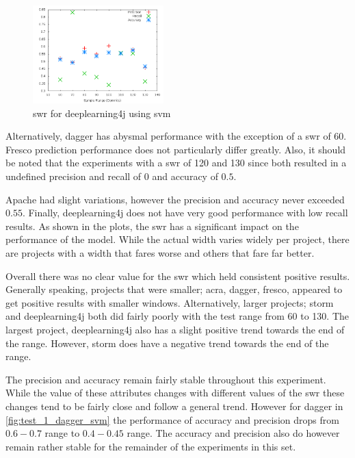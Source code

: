 \begin{figure}[h]
    \centering
        \includegraphics[width=0.45\textwidth]{images/svm/test_1/deeplearning4j_sample_range}
    \caption{\gls{swr} for deeplearning4j using \gls{svm}}
    \label{fig:test_1_deeplearning4j_svm}
\end{figure}

Alternatively, dagger has abysmal performance with the exception of a \gls{swr} of 60. Fresco prediction performance does not particularly differ greatly. Also, it should be noted that the experiments with a \gls{swr} of 120 and 130 since both resulted in a undefined precision and recall of 0 and accuracy of $0.5$.

Apache had slight variations, however the precision and accuracy never exceeded $0.55$. Finally, deeplearning4j does not have very good performance with low recall results. As shown in the plots, the \gls{swr} has a significant impact on the performance of the model. While the actual width varies widely per project, there are projects with a width that fares worse and others that fare far better.

Overall there was no clear value for the \gls{swr} which held consistent positive results. Generally speaking, projects that were smaller; acra, dagger, fresco, appeared to get positive results with smaller windows. Alternatively, larger projects; storm and deeplearning4j both did fairly poorly with the test range from 60 to 130. The largest project, deeplearning4j also has a slight positive trend towards the end of the range. However, storm does have a negative trend towards the end of the range.

The precision and accuracy remain fairly stable throughout this experiment. While the value of these attributes changes with different values of the \gls{swr} these changes tend to be fairly close and follow a general trend. However for dagger in \autoref{fig:test_1_dagger_svm} the performance of accuracy and precision drops from $0.6 - 0.7$ range to $0.4 - 0.45$ range. The accuracy and precision also do however remain rather stable for the remainder of the experiments in this set.

